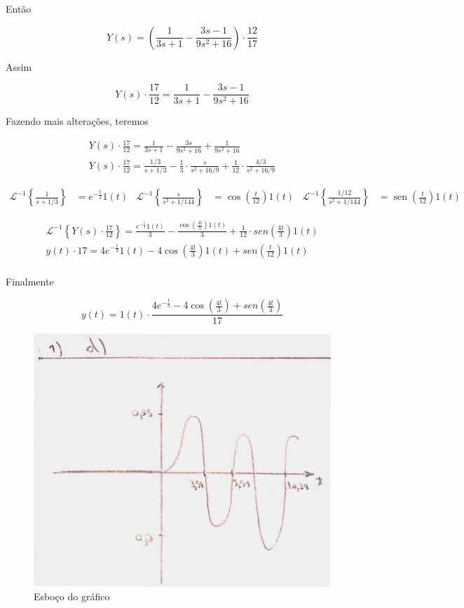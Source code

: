 \documentclass{article}
\DeclareMathOperator{\sen}{sen}
\begin{document}
Então

\[Y(s) = \left(\frac{1}{3s + 1} - \frac{3s - 1}{9s^2 + 16}\right) \cdot \frac{12}{17}\]

Assim

\[Y(s) \cdot \frac{17}{12} = \frac{1}{3s + 1} - \frac{3s - 1}{9s^2 + 16}\]

Fazendo mais alterações, teremos

\begin{align*}
    Y(s) \cdot \frac{17}{12} = \frac{1}{3s + 1} - \frac{3s}{9s^2 + 16} + \frac{1}{9s^2 + 16}\\
    Y(s) \cdot \frac{17}{12} = \frac{1/3}{s + 1/3} - \frac{1}{3}\cdot\frac{s}{s^2 + 16/9} + \frac{1}{12}\cdot\frac{4/3}{s^2 + 16/9}
\end{align*}

\begin{align*}
    \mathcal{L}^{-1} \left\{\frac{1}{s + 1/3}\right\} &= e^{-\frac{t}{3}}1(t) & \mathcal{L}^{-1} \left\{\frac{s}{s^2 + 1/144}\right\} &= \cos\left(\frac{t}{12}\right)1(t) & \mathcal{L}^{-1} \left\{\frac{1/12}{s^2 + 1/144}\right\} &= \sen\left(\frac{t}{12}\right)1(t)
\end{align*}

\begin{align*}
    \mathcal{L}^{-1} \left\{Y(s) \cdot \frac{17}{12}\right\} = \frac{e^{-\frac{t}{3}}1(t)}{3} - \frac{\cos\left(\frac{4t}{3}\right)1(t)}{3} + \frac{1}{12}\cdot sen\left(\frac{4t}{3}\right)1(t)\\
    y(t) \cdot 17 = 4e^{-\frac{t}{3}}1(t) - 4\cos\left(\frac{4t}{3}\right)1(t) + sen\left(\frac{t}{12}\right)1(t)\\
\end{align*}

Finalmente

\[y(t) = 1(t)\cdot\frac{4e^{-\frac{t}{3}} - 4\cos\left(\frac{4t}{3}\right) + sen\left(\frac{4t}{3}\right)}{17}\]

\begin{figure}[h]
    \includegraphics[scale=0.21]{Q1_d.png}
    \centering
    \caption{Esboço do gráfico}
\end{figure}
\end{document}
